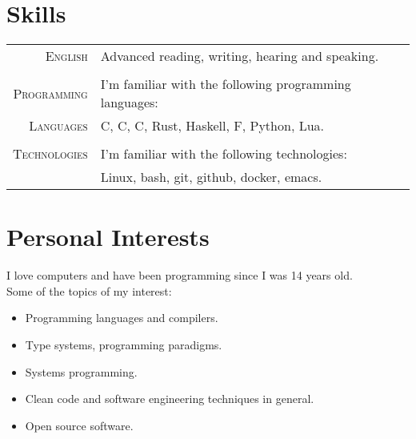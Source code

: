 \documentclass[a4paper,10pt]{article}
\newcommand{\cpp}{C\protect\scalebox{0.8}{\protect\raisebox{0.4ex}{++}}}
\renewcommand\#{\protect\scalebox{0.8}{\protect\raisebox{0.4ex}{\char"0023}}}
\begin{document}
\section{Skills}
\begin{tabular}{r|l}
  \textsc{English} & Advanced reading, writing, hearing and speaking. \\
  
  \multicolumn{2}{c}{} \\
  \textsc{Programming} & I'm familiar with the following programming languages: \\
  \textsc{Languages} & C, \cpp, C\#, Rust, Haskell, F\#, Python, Lua. \\
  
  \multicolumn{2}{c}{} \\
  \textsc{Technologies} & I'm familiar with the following technologies: \\
  & Linux, bash, git, github, docker, emacs.
\end{tabular}


\section{Personal Interests}
I love computers and have been programming since I was 14 years old. \\
Some of the topics of my interest:
\vspace{-3pt}
\begin{itemize}
  \setlength\itemsep{-3pt}
  \item Programming languages and compilers.
  \item Type systems, programming paradigms.
  \item Systems programming.
  \item Clean code and software engineering techniques in general.
  \item Open source software.
\end{itemize} \vspace{5pt}
\end{document}
